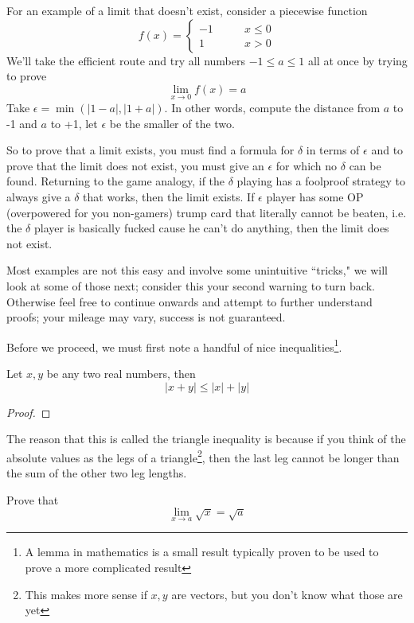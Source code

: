 \begin{example}
	For an example of a limit that doesn't exist, consider a piecewise function
	\[ f(x) = \begin{cases}
	-1 \qquad &x \leq 0 \\
	1 \qquad &x > 0
	\end{cases} \]
	We'll take the efficient route and try all numbers $-1 \leq a \leq 1$ all at once by trying to prove
	\[ \lim_{x \to 0} f(x) = a \]
	Take $\epsilon = \min(|1 - a|, |1 + a|)$. In other words, compute the distance from $a$ to -1 and $a$ to +1, let $\epsilon$ be the smaller of the two. 
\end{example}

So to prove that a limit exists, you must find a formula for $\delta$ in terms of $\epsilon$ and to prove that the limit does not exist, you must give an $\epsilon$ for which no $\delta$ can be found. Returning to the game analogy, if the $\delta$ playing has a foolproof strategy to always give a $\delta$ that works, then the limit exists. If $\epsilon$ player has some OP (overpowered for you non-gamers) trump card that literally cannot be beaten, i.e. the $\delta$ player is basically fucked cause he can't do anything, then the limit does not exist.

Most examples are not this easy and involve some unintuitive ``tricks," we will look at some of those next; consider this your second warning to turn back. Otherwise feel free to continue onwards and attempt to further understand proofs; your mileage may vary, success is not guaranteed.

Before we proceed, we must first note a handful of nice inequalities\footnote{A lemma in mathematics is a small result typically proven to be used to prove a more complicated result}. 
\begin{lemma}
	Let $x, y$ be any two real numbers, then
	\[ |x + y| \leq |x| + |y| \]
\end{lemma}
\begin{proof}

\end{proof}

The reason that this is called the triangle inequality is because if you think of the absolute values as the legs of a triangle\footnote{This makes more sense if $x, y$ are vectors, but you don't know what those are yet}, then the last leg cannot be longer than the sum of the other two leg lengths.

\begin{example}
	Prove that
	\[ \lim_{x \to a} \sqrt{x} = \sqrt{a} \]
\end{example}

